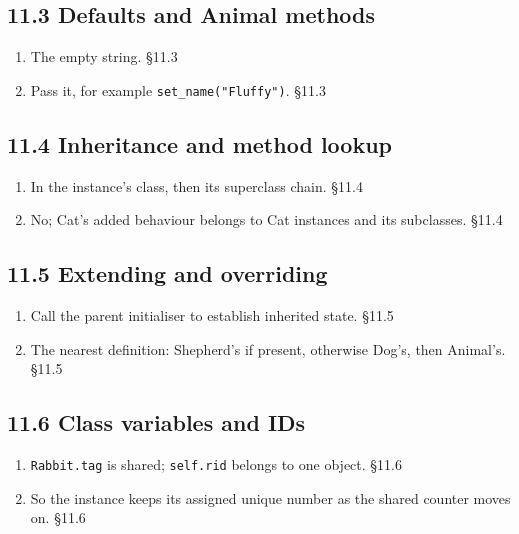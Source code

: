 \documentclass[11pt]{article}
\begin{document}
\begin{keepsection}\subsection{11.3 Defaults and Animal methods}

\begin{enumerate}
\item The empty string. \hfill{\small\color{FAUblue}§11.3}
\item Pass it, for example \texttt{set\_name("Fluffy")}. \hfill{\small\color{FAUblue}§11.3}
\end{enumerate}

\end{keepsection}
\begin{keepsection}\subsection{11.4 Inheritance and method lookup}

\begin{enumerate}
\item In the instance’s class, then its superclass chain. \hfill{\small\color{FAUblue}§11.4}
\item No; Cat’s added behaviour belongs to Cat instances and its subclasses. \hfill{\small\color{FAUblue}§11.4}
\end{enumerate}

\end{keepsection}
\begin{keepsection}\subsection{11.5 Extending and overriding}

\begin{enumerate}
\item Call the parent initialiser to establish inherited state. \hfill{\small\color{FAUblue}§11.5}
\item The nearest definition: Shepherd’s if present, otherwise Dog’s, then Animal’s. \hfill{\small\color{FAUblue}§11.5}
\end{enumerate}

\end{keepsection}
\begin{keepsection}\subsection{11.6 Class variables and IDs}

\begin{enumerate}
\item \texttt{Rabbit.tag} is shared; \texttt{self.rid} belongs to one object. \hfill{\small\color{FAUblue}§11.6}
\item So the instance keeps its assigned unique number as the shared counter moves on. \hfill{\small\color{FAUblue}§11.6}
\end{enumerate}

\end{keepsection}
\end{document}
